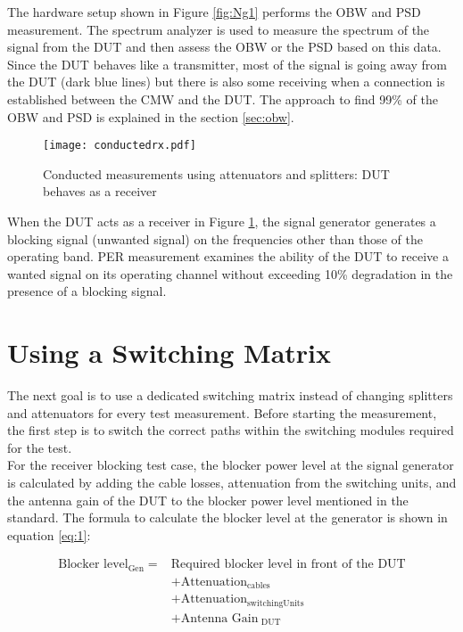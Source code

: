 The hardware setup shown in Figure \ref{fig:Ng1} performs the \acf{OBW} and \acf{PSD} measurement. The spectrum analyzer is used to measure the spectrum of the signal from the \acs{DUT} and then assess the \acf{OBW} or the \acf{PSD} based on this data. Since the \acs{DUT} behaves like a transmitter, most of the signal is going away from the \acs{DUT} (dark blue lines) but there is also some receiving when a connection is established between the \acf{CMW} and the \acs{DUT}. The approach to find 99\% of the \acf{OBW} and \acf{PSD} is explained in the section \ref{sec:obw}.

\begin{figure}[H]
\centering
   \texttt{[image: conductedrx.pdf]}
 \vspace{-0.5cm} \caption{Conducted measurements using attenuators and splitters: \acs{DUT} behaves as a receiver}
   \label{fig:Ng2}
\end{figure}

When the \acs{DUT} acts as a receiver in Figure \ref{fig:Ng2}, the signal generator generates a blocking signal (unwanted signal) on the frequencies other than those of the operating band.  \acf{PER} measurement examines the ability of the \acs{DUT} to receive a wanted signal on its operating channel without exceeding 10\% degradation in the presence of a blocking signal. 

\section{Using a Switching Matrix}
\label{sec:switch}
The next goal is to use a dedicated switching matrix instead of changing splitters and attenuators for every test measurement. Before starting the measurement, the first step is to switch the correct paths within the switching modules required for the test. \\

For the receiver blocking test case, the blocker power level at the signal generator is calculated by adding the cable losses, attenuation from the switching units, and the antenna gain of the \acs{DUT} to the blocker power level mentioned in the standard. The formula to calculate the blocker level at the generator is shown in equation \ref{eq:1}:

\begin{equation}
\begin{aligned}
\mbox{Blocker level}_ {\mbox{Gen}} = &\mbox{Required blocker level in front of the DUT} \\
&+ \mbox{Attenuation}_{\mbox{cables}} \\
&+ \mbox{Attenuation}_{\mbox{switchingUnits}}  \\
&+ \mbox{Antenna Gain}_{\mbox{ DUT}}
\label{eq:1}
\end{aligned}
\end{equation}

